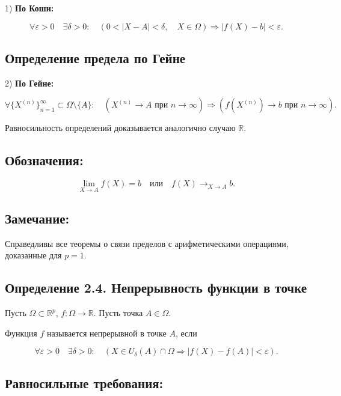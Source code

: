 {1) \textbf{По Коши:}  



\[
\forall \varepsilon > 0 \quad \exists \delta > 0: \quad (0 < |X - A| < \delta, \quad X \in \Omega) \Rightarrow |f(X) - b| < \varepsilon.
\]

\subsection*{Определение предела по Гейне}

2) \textbf{По Гейне: }

\[
\forall \{X^{(n)}\}_{n=1}^{\infty} \subset \Omega \setminus \{A\} : \quad (X^{(n)} \to A \text{ при } n \to \infty) \Rightarrow (f(X^{(n)}) \to b \text{ при } n \to \infty).
\]



Равносильность определений доказывается аналогично случаю \( \mathbb{R} \).  

\subsection*{Обозначения:  }



\[
\lim_{X \to A} f(X) = b \quad \text{или} \quad f(X) \to_{X \to A} b.
\]



\subsection*{Замечание:  }

Справедливы все теоремы о связи пределов с арифметическими операциями, доказанные для \( p = 1 \).


\subsection*{Определение 2.4. Непрерывность функции в точке}

Пусть \( \Omega \subset \mathbb{R}^p \), \( f: \Omega \to \mathbb{R} \). Пусть точка \( A \in \Omega \).

Функция \( f \) называется непрерывной в точке \( A \), если



\[
\forall \varepsilon > 0 \quad \exists \delta > 0: \quad (X \in U_{\delta}(A) \cap \Omega \Rightarrow |f(X) - f(A)| < \varepsilon).
\]



\subsection*{Равносильные требования:}

}
